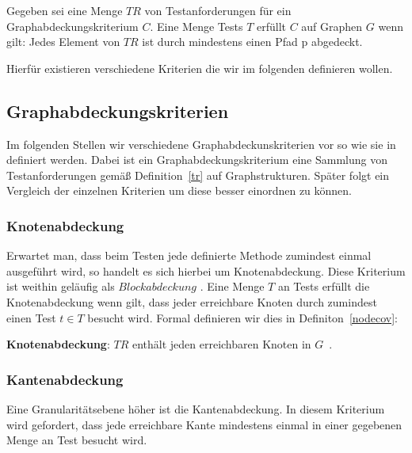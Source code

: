 \begin{definition}
    Gegeben sei eine Menge $TR$ von Testanforderungen für ein Graphabdeckungskriterium $C$.
    Eine Menge Tests $T$ erfüllt $C$ auf Graphen $G$ wenn gilt: Jedes Element von $TR$ ist durch mindestens einen Pfad p abgedeckt.
    \cite[vgl. Def. 2.32]{software-testing}
    \label{graphcov}
\end{definition}

Hierfür existieren verschiedene Kriterien die wir im folgenden definieren wollen.

\subsection{Graphabdeckungskriterien}

Im folgenden Stellen wir verschiedene Graphabdeckunskriterien vor so wie sie in~\cite{software-testing} definiert werden.
Dabei ist ein Graphabdeckungskriterium eine Sammlung von Testanforderungen gemäß Definition~\ref{tr} auf Graphstrukturen.
Später folgt ein Vergleich der einzelnen Kriterien um diese besser einordnen zu können.

\subsubsection{Knotenabdeckung}

Erwartet man, dass beim Testen jede definierte Methode zumindest einmal ausgeführt wird, so handelt es sich hierbei um Knotenabdeckung.
Diese Kriterium ist weithin geläufig als $Blockabdeckung$ \cite[vgl. 2.2.1]{software-testing}.
Eine Menge $T$ an Tests erfüllt die Knotenabdeckung wenn gilt, dass jeder erreichbare Knoten durch zumindest einen Test $t \in T$ besucht wird.
Formal definieren wir dies in Definiton~\ref{nodecov}: 

\begin{definition}
    \textbf{Knotenabdeckung}: $TR$ enthält jeden erreichbaren Knoten in $G$~\cite[vgl. Criterion 2.1]{software-testing}.
    \label{nodecov}
\end{definition}


\subsubsection{Kantenabdeckung}

Eine Granularitätsebene höher ist die Kantenabdeckung.
In diesem Kriterium wird gefordert, dass jede erreichbare Kante mindestens einmal in einer gegebenen Menge an Test besucht wird.

